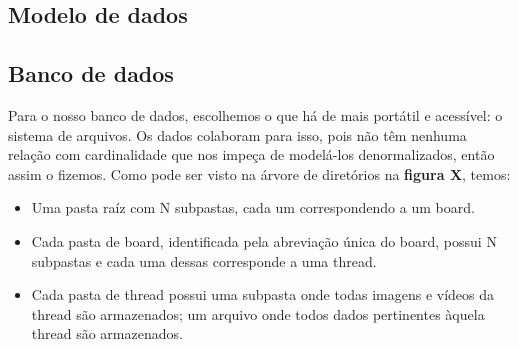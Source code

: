 \subsection{Modelo de dados}


\subsection{Banco de dados}

Para o nosso banco de dados, escolhemos o que há de mais portátil e acessível: o sistema de arquivos.
Os dados colaboram para isso, pois não têm nenhuma relação com cardinalidade que nos impeça de modelá-los denormalizados, então assim o fizemos. Como pode ser visto na árvore de diretórios na \textbf{figura X}, temos:

\begin{itemize}
    \item Uma pasta raíz com N subpastas, cada um correspondendo a um board.
    \item Cada pasta de board, identificada pela abreviação única do board, possui N subpastas e cada uma dessas corresponde a uma thread.
    \item Cada pasta de thread possui 
        \subitem uma subpasta  onde todas imagens e vídeos da thread são armazenados;
        \subitem um arquivo  onde todos dados pertinentes àquela thread são armazenados.
\end{itemize}

